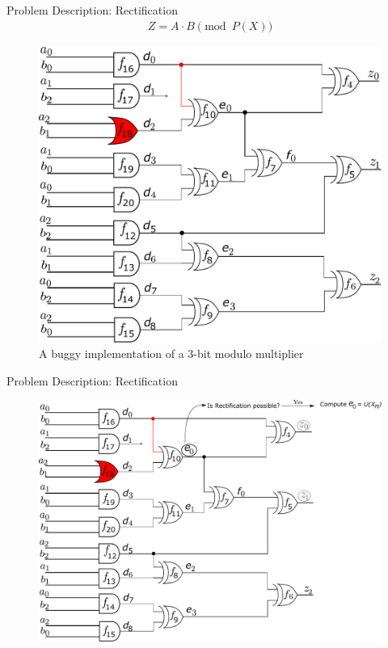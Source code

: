 
\begin{frame}{\large Problem Description: Rectification}
\vspace{-0.1in}
\begin{align*}
Z = A\cdot B \pmod{P(X)}
\end{align*}
\vspace{-0.1in}
\begin{figure}[hbt]
\centering
\includegraphics[scale=0.32]{mas_3_sfr.pdf}
\caption*{A buggy implementation of a 3-bit modulo multiplier}
\end{figure}
\end{frame}

\begin{frame}{\large Problem Description: Rectification}
\begin{figure}[hbt]
\centering
\includegraphics[scale=0.35]{mas_3_sfr2.pdf}
\end{figure}
\end{frame}

